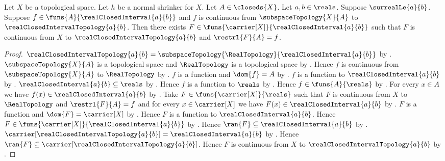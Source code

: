 \begin{theorem}\label{tietze_extension_closed_interval_from_normal_shrinker}
    Let $X$ be a topological space.
    Let $h$ be a normal shrinker for $X$.
    Let $A\in\closeds{X}$.
    Let $a,b\in\reals$.
    Suppose $\surrealLe{a}{b}$.
    Suppose $f\in\funs{A}{\realClosedInterval{a}{b}}$ and
        $f$ is continuous from $\subspaceTopology{X}{A}$ to
            $\realClosedIntervalTopology{a}{b}$.
    Then there exists
        $F\in\funs{\carrier[X]}{\realClosedInterval{a}{b}}$ such that
        $F$ is continuous from $X$ to
            $\realClosedIntervalTopology{a}{b}$ and
        $\restrl{F}{A}=f$.
\end{theorem}
\begin{proof}
    $\realClosedIntervalTopology{a}{b}
        =\subspaceTopology{\RealTopology}{\realClosedInterval{a}{b}}$
        by .
    $\subspaceTopology{X}{A}$ is a topological space and
        $\RealTopology$ is a topological space
        by
        .
    Hence $f$ is continuous from $\subspaceTopology{X}{A}$ to
        $\RealTopology$
        by .
    $f$ is a function and $\dom{f}=A$
        by .
    $f$ is a function to $\realClosedInterval{a}{b}$
        by .
    $\realClosedInterval{a}{b}\subseteq\reals$
        by .
    Hence $f$ is a function to $\reals$
        by .
    Hence $f\in\funs{A}{\reals}$ by .
    For every $x\in A$ we have
        $f(x)\in\realClosedInterval{a}{b}$
        by .
    Take $F\in\funs{\carrier[X]}{\reals}$ such that
        $F$ is continuous from $X$ to $\RealTopology$ and
        $\restrl{F}{A}=f$ and
        for every $x\in\carrier[X]$ we have
            $F(x)\in\realClosedInterval{a}{b}$
        by
        .
    $F$ is a function and $\dom{F}=\carrier[X]$
        by .
    Hence $F$ is a function to $\realClosedInterval{a}{b}$.
    Hence
        $F\in\funs{\carrier[X]}{\realClosedInterval{a}{b}}$
        by .
    Hence $\ran{F}\subseteq\realClosedInterval{a}{b}$
        by .
    $\carrier[\realClosedIntervalTopology{a}{b}]
        =\realClosedInterval{a}{b}$
        by .
    Hence
        $\ran{F}\subseteq\carrier[\realClosedIntervalTopology{a}{b}]$.
    Hence $F$ is continuous from $X$ to
        $\realClosedIntervalTopology{a}{b}$
        by .
\end{proof}

